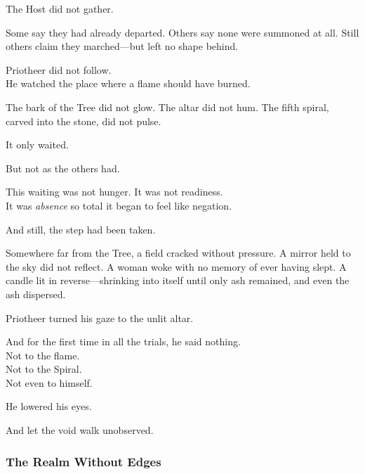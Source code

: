 \documentclass[12pt]{article}
\begin{document}
\vspace{0.5em}
The Host did not gather.

\vspace{0.5em}
Some say they had already departed. Others say none were summoned at all. Still others claim they marched---but left no shape behind.

\vspace{0.5em}
Priotheer did not follow.\\
He watched the place where a flame should have burned.

\vspace{0.5em}
The bark of the Tree did not glow. The altar did not hum. The fifth spiral, carved into the stone, did not pulse.

\vspace{0.5em}
It only waited.

\vspace{0.5em}
But not as the others had.

\vspace{0.5em}
This waiting was not hunger. It was not readiness.\\
It was \textit{absence} so total it began to feel like negation.

\vspace{0.5em}
And still, the step had been taken.

\vspace{0.5em}
Somewhere far from the Tree, a field cracked without pressure. A mirror held to the sky did not reflect. A woman woke with no memory of ever having slept. A candle lit in reverse---shrinking into itself until only ash remained, and even the ash dispersed.

\vspace{0.5em}
Priotheer turned his gaze to the unlit altar.

\vspace{0.5em}
And for the first time in all the trials, he said nothing.\\
Not to the flame.\\
Not to the Spiral.\\
Not even to himself.

\vspace{0.5em}
He lowered his eyes.

\vspace{0.5em}
And let the void walk unobserved.

\dotfill

\subsubsection*{The Realm Without Edges}
\end{document}
